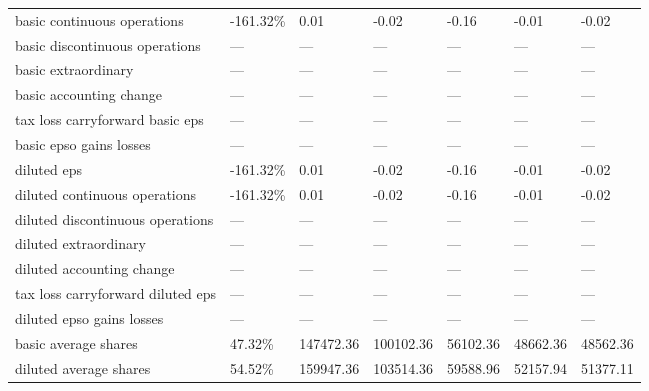 \begin{table}[]
{\begin{tabular}{@{}lllllll@{}}
basic continuous operations                                   & -161.32\%  & 0.01      & -0.02     & -0.16    & -0.01    & -0.02    \\
basic discontinuous operations                                & —          & —         & —         & —        & —        & —        \\
basic extraordinary                                           & —          & —         & —         & —        & —        & —        \\
basic accounting change                                       & —          & —         & —         & —        & —        & —        \\
tax loss carryforward basic eps                               & —          & —         & —         & —        & —        & —        \\
basic epso gains losses                                       & —          & —         & —         & —        & —        & —        \\
diluted eps                                                   & -161.32\%  & 0.01      & -0.02     & -0.16    & -0.01    & -0.02    \\
diluted continuous operations                                 & -161.32\%  & 0.01      & -0.02     & -0.16    & -0.01    & -0.02    \\
diluted discontinuous operations                              & —          & —         & —         & —        & —        & —        \\
diluted extraordinary                                         & —          & —         & —         & —        & —        & —        \\
diluted accounting change                                     & —          & —         & —         & —        & —        & —        \\
tax loss carryforward diluted eps                             & —          & —         & —         & —        & —        & —        \\
diluted epso gains losses                                     & —          & —         & —         & —        & —        & —        \\
basic average shares                                          & 47.32\%    & 147472.36 & 100102.36 & 56102.36 & 48662.36 & 48562.36 \\
diluted average shares                                        & 54.52\%    & 159947.36 & 103514.36 & 59588.96 & 52157.94 & 51377.11 \\

\end{tabular}}
\end{table}
